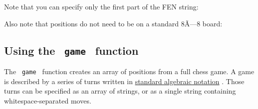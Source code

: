 Note that you can specify only the first part of the FEN string:

\begin{Shaded}
\begin{Highlighting}[]
\end{Highlighting}
\end{Shaded}

\pandocbounded{}

Also note that positions do not need to be on a standard 8Ã---8 board:

\begin{Shaded}
\begin{Highlighting}[]
\NormalTok{))}
\end{Highlighting}
\end{Shaded}

\pandocbounded{}

\subsection{\texorpdfstring{Using the \texttt{\ game\ }
function}{Using the  game  function}}\label{using-the-game-function}

The \texttt{\ game\ } function creates an array of positions from a full
chess game. A game is described by a series of turns written in
\href{https://en.wikipedia.org/wiki/Algebraic_notation_(chess)}{standard
algebraic notation} . Those turns can be specified as an array of
strings, or as a single string containing whitespace-separated moves.

\begin{Shaded}
\begin{Highlighting}[]
\NormalTok{)}
\end{Highlighting}
\end{Shaded}

